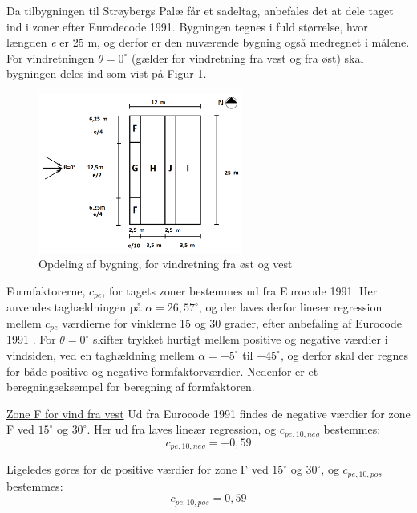 Da tilbygningen til Strøybergs Palæ får et sadeltag, anbefales det at dele taget ind i zoner efter Eurodecode 1991. Bygningen tegnes i fuld størrelse, hvor længden \textit{e} er 25 m, og derfor er den nuværende bygning også medregnet i målene. For vindretningen $\theta = 0^{\circ}$ (gælder for vindretning fra vest og fra øst) skal bygningen deles ind som vist på Figur \ref{fig:opdeling}.  

\begin{figure}[htbp]
	\centering
	\includegraphics[width=0.6\textwidth]{billeder/opdeling.png}
	\caption{Opdeling af bygning, for vindretning fra øst og vest \citep[ kapitel 7.2.5]{EU91}}
	\label{fig:opdeling}
\end{figure}

Formfaktorerne, $c_{pe}$, for tagets zoner bestemmes ud fra Eurocode 1991. Her anvendes taghældningen på $\alpha = 26,\!57^{\circ}$, og der laves derfor lineær regression mellem $c_{pe}$ værdierne for vinklerne 15 og 30 grader, efter anbefaling af Eurocode 1991 \citep[ tabel 7.4a kapitel 7.2.5]{EU91}. For $\theta = 0^{\circ}$ skifter trykket hurtigt mellem positive og negative værdier i vindsiden, ved en taghældning mellem $\alpha = -5^{\circ}$ til $+ 45^{\circ}$, og derfor skal der regnes for både positive og negative formfaktorværdier. 
\newline \indent{     }  Nedenfor er et beregningseksempel for beregning af formfaktoren.


\underline{Zone F for vind fra vest}
\newline
Ud fra Eurocode 1991 \citep[ tabel 7.4a kapitel 7.2.5]{EU91} findes de negative værdier for zone F ved $15^{\circ}$ og $30^{\circ}$. Her ud fra laves lineær regression, og $c_{pe,10,neg}$ bestemmes:
\begin{equation}
	c_{pe,10,neg} = -0,\!59
\end{equation}

Ligeledes gøres for de positive værdier for zone F ved $15^{\circ}$ og $30^{\circ}$, og $c_{pe,10,pos}$ bestemmes:
\begin{equation}
	c_{pe,10,pos}=0,\!59
\end{equation}

